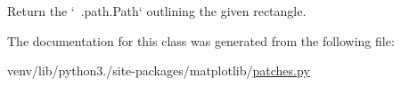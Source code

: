 \begin{DoxyVerb}Return the `~.path.Path` outlining the given rectangle.\end{DoxyVerb}
 

The documentation for this class was generated from the following file\+:\begin{DoxyCompactItemize}
\item 
venv/lib/python3./site-\/packages/matplotlib/\hyperlink{patches_8py}{patches.\+py}\end{DoxyCompactItemize}
